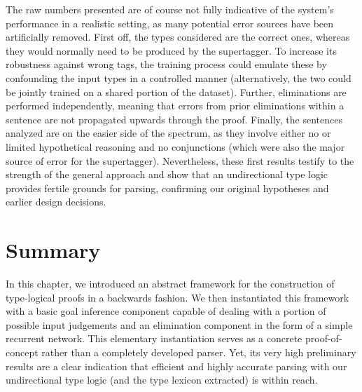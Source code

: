 The raw numbers presented are of course not fully indicative of the system's performance in a realistic setting, as many potential error sources have been artificially removed.
First off, the types considered are the correct ones, whereas they would normally need to be produced by the supertagger.
To increase its robustness against wrong tags, the training process could emulate these by confounding the input types in a controlled manner (alternatively, the two could be jointly trained on a shared portion of the dataset).
Further, eliminations are performed independently, meaning that errors from prior eliminations within a sentence are not propagated upwards through the proof.
Finally, the sentences analyzed are on the easier side of the spectrum, as they involve either no or limited hypothetical reasoning and no conjunctions (which were also the major source of error for the supertagger).
Nevertheless, these first results testify to the strength of the general approach and show that an undirectional type logic provides fertile grounds for parsing, confirming our original hypotheses and earlier design decisions.

\section{Summary}
In this chapter, we introduced an abstract framework for the construction of type-logical proofs in a backwards fashion.
We then instantiated this framework with a basic goal inference component capable of dealing with a portion of possible input judgements and an elimination component in the form of a simple recurrent network.
This elementary instantiation serves as a concrete proof-of-concept rather than a completely developed parser.
Yet, its very high preliminary results are a clear indication that efficient and highly accurate parsing with our undirectional type logic (and the type lexicon extracted) is within reach.
